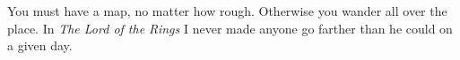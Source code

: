 You must have a map, no matter how rough. Otherwise you wander all over the place. In \emph{The Lord of the Rings} I never made anyone go farther than he could on a given day.